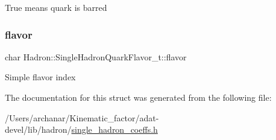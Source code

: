 True means quark is barred \mbox{\label{structHadron_1_1SingleHadronQuarkFlavor__t_a1a2a95305c9eb98e74a72c281a4cd36c}} 
\subsubsection{\texorpdfstring{flavor}{flavor}}
{\footnotesize\ttfamily char Hadron\+::\+Single\+Hadron\+Quark\+Flavor\+\_\+t\+::flavor}

Simple flavor index 

The documentation for this struct was generated from the following file\+:\begin{DoxyCompactItemize}
\item 
/\+Users/archanar/\+Kinematic\+\_\+factor/adat-\/devel/lib/hadron/\mbox{\hyperlink{adat-devel_2lib_2hadron_2single__hadron__coeffs_8h}{single\+\_\+hadron\+\_\+coeffs.\+h}}\end{DoxyCompactItemize}
